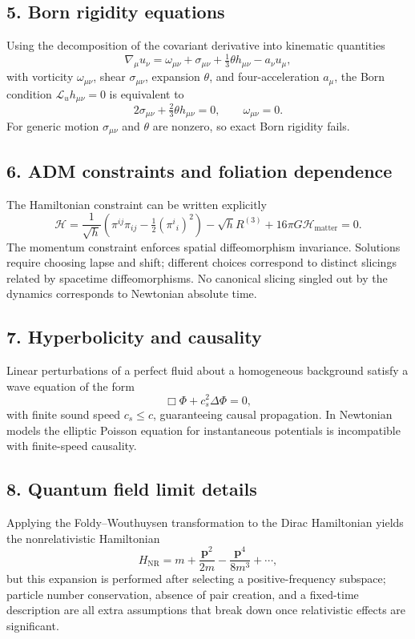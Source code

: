 \documentclass[12pt]{article}
\begin{document}
\subsection*{5. Born rigidity equations}
Using the decomposition of the covariant derivative into kinematic quantities
\begin{equation}
 \nabla_\mu u_\nu = \omega_{\mu\nu} + \sigma_{\mu\nu} + \tfrac{1}{3} \theta h_{\mu\nu} - a_\nu u_\mu,
\end{equation}
with vorticity $\omega_{\mu\nu}$, shear $\sigma_{\mu\nu}$, expansion $\theta$, and four-acceleration $a_\mu$, the Born condition $\mathcal{L}_u h_{\mu\nu}=0$ is equivalent to
\begin{equation}
 2\sigma_{\mu\nu} + \tfrac{2}{3}\theta h_{\mu\nu} = 0, \qquad \omega_{\mu\nu} = 0.
\end{equation}
For generic motion $\sigma_{\mu\nu}$ and $\theta$ are nonzero, so exact Born rigidity fails.

\subsection*{6. ADM constraints and foliation dependence}
The Hamiltonian constraint can be written explicitly
\begin{equation}
 \mathcal{H} = \frac{1}{\sqrt{h}}\left(\pi^{ij}\pi_{ij} - \tfrac{1}{2}(\pi^i{}_i)^2\right) - \sqrt{h} R^{(3)} + 16\pi G \mathcal{H}_{\text{matter}} = 0.
\end{equation}
The momentum constraint enforces spatial diffeomorphism invariance. Solutions require choosing lapse and shift; different choices correspond to distinct slicings related by spacetime diffeomorphisms. No canonical slicing singled out by the dynamics corresponds to Newtonian absolute time.

\subsection*{7. Hyperbolicity and causality}
Linear perturbations of a perfect fluid about a homogeneous background satisfy a wave equation of the form
\begin{equation}
 \Box\Phi + c_s^2 \Delta \Phi = 0,
\end{equation}
with finite sound speed $c_s\le c$, guaranteeing causal propagation. In Newtonian models the elliptic Poisson equation for instantaneous potentials is incompatible with finite-speed causality.

\subsection*{8. Quantum field limit details}
Applying the Foldy--Wouthuysen transformation to the Dirac Hamiltonian yields the nonrelativistic Hamiltonian
\begin{equation}
 H_{\text{NR}} = m + \frac{\mathbf{p}^2}{2m} - \frac{\mathbf{p}^4}{8 m^3} + \cdots,
\end{equation}
but this expansion is performed after selecting a positive-frequency subspace; particle number conservation, absence of pair creation, and a fixed-time description are all extra assumptions that break down once relativistic effects are significant.
\end{document}
